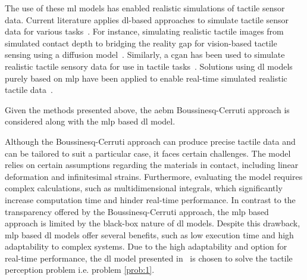The use of these \gls{ml} models has enabled realistic simulations of tactile sensor data. Current literature applies \gls{dl}-based approaches to simulate tactile sensor data for various tasks~\cite{more-than-a-feeling-learning-to-grasp-and-regrasp-using-vision-and-touch, single-grasp-object-classification-and-feature-extraction-with-simple-robot-hands-and-tactile-sensors}. For instance, simulating realistic tactile images from simulated contact depth to bridging
the reality gap for vision-based tactile sensing using a diffusion model~\cite{learning-to-read-braille:-bridging-the-tactile-reality-gap-with-diffusion-models}. Similarly, a \gls{cgan} has been used to simulate realistic tactile sensory data for use in tactile tasks~\cite{learning-to-read-braille:-bridging-the-tactile-reality-gap-with-diffusion-models}. Solutions using \gls{dl} models purely based on \gls{mlp} have been applied to enable real-time simulated realistic tactile data~\cite{simulation-of-the-syntouch-biotac-sensor}. \medskip

Given the methods presented above, the \gls{aebm} Boussinesq-Cerruti approach is considered along with the \gls{mlp} based \gls{dl} model. \medskip

Although the Boussinesq-Cerruti approach can produce precise tactile data and can be tailored to suit a particular case, it faces certain challenges. The model relies on certain assumptions regarding the materials in contact, including linear deformation and infinitesimal strains. Furthermore, evaluating the model requires complex calculations, such as multidimensional integrals, which significantly increase computation time and hinder real-time performance. In contrast to the transparency offered by the Boussinesq-Cerruti approach, the \gls{mlp} based approach is limited by the black-box nature of \gls{dl} models. Despite this drawback, \gls{mlp} based \gls{dl} models offer several benefits, such as low execution time and high adaptability to complex systems. Due to the high adaptability and option for real-time performance, the \gls{dl} model presented in~\cite{simulation-of-the-syntouch-biotac-sensor} is chosen to solve the tactile perception problem i.e. problem \ref{prob:1}.


